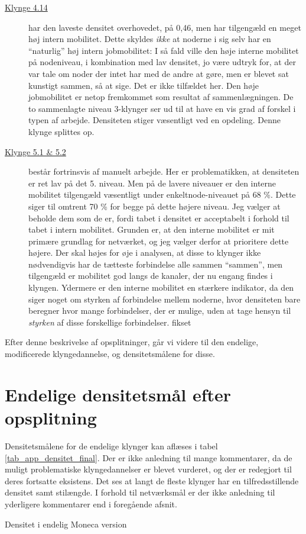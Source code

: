 \begin{description}
    \item[\underline{Klynge 4.14}] har den laveste densitet overhovedet, på 0,46, men har tilgengæld en meget høj intern mobilitet. Dette skyldes \emph{ikke} at noderne i sig selv har en “naturlig” høj intern jobmobilitet: I så fald ville den høje interne mobilitet på nodeniveau, i kombination med lav densitet, jo være udtryk for, at der  var tale om noder der intet har med de andre at gøre, men er blevet sat kunstigt sammen, så at sige. Det er ikke tilfældet her. Den høje jobmobilitet er netop fremkommet som resultat af sammenlægningen. De to sammenlagte niveau 3-klynger ser ud til at have en vis grad af forskel i typen af arbejde. Densiteten stiger væsentligt ved en opdeling. Denne klynge splittes op. 

    \item[\underline{Klynge 5.1 \& 5.2}] består fortrinsvis af manuelt arbejde. Her er problematikken, at densiteten er ret lav på det 5. niveau. Men på de lavere niveauer er den interne mobilitet tilgengæld væsentligt under enkeltnode-niveauet på 68 \%. Dette siger til omtrent 70 \% for begge på dette højere niveau. Jeg vælger at beholde dem som de er, fordi tabet i densitet er acceptabelt i forhold til tabet i intern mobilitet. Grunden er, at den interne mobilitet er mit primære grundlag for netværket, og jeg vælger derfor at prioritere dette højere. Der skal højes for øje i analysen, at disse to klynger ikke nødvendigvis har de tætteste forbindelse alle sammen “sammen”, men tilgengæld er mobilitet god langs de kanaler, der nu engang findes i klyngen. Ydermere er den interne mobilitet en stærkere indikator, da den siger noget om styrken af forbindelse mellem noderne, hvor densiteten bare beregner hvor mange forbindelser, der er mulige, uden at tage hensyn til \emph{styrken} af disse forskellige forbindelser. fikset

\end{description}
% 
Efter denne beskrivelse af opsplitninger, går vi videre til den endelige, modificerede klyngedannelse, og densitetsmålene for disse. 

%
\section{Endelige densitetsmål efter opsplitning}
%

Densitetsmålene for de endelige klynger kan aflæses i tabel \ref{tab_app_densitet_final}. Der er ikke anledning til mange kommentarer, da de muligt problematiske klyngedannelser er blevet vurderet, og der er redegjort til deres fortsatte eksistens. Det ses at langt de fleste klynger har en tilfredsstillende densitet samt stilængde. I forhold til netværksmål er der ikke anledning til yderligere kommentarer end i foregående afsnit. 
%
\begin{table}[H]
  \centering
    \resizebox{5cm}{!}{%

}
  \caption{Densitet i endelig Moneca version}
  \label{tab_app_densitet_final}%
\end{table}
%

